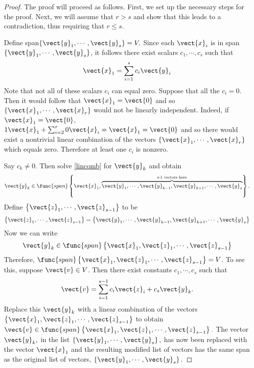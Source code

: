 \begin{proof} The proof will proceed as follows. First, we set up the necessary steps for the proof. Next, we will assume that $r > s$ and show that this leads to a contradiction, thus requiring that $r \leq s$. 

Define span$\left\{ \vect{y}_{1},\cdots ,\vect{y}_{s}\right\} = V.$ Since each $\vect{x}_i$ is in  span$\left\{ \vect{y}_{1},\cdots ,\vect{y}_{s}\right\}$, it follows there exist scalars $c_{1},\cdots ,c_{s}$
such that 
\begin{equation}
\vect{x}_{1}=\sum_{i=1}^{s}c_{i}\vect{y}_{i}  \label{lincomb}
\end{equation}
Note that not all of these scalars $c_i$ can equal zero. Suppose that all the $c_i=0$. Then it
would follow that $\vect{x}_{1}=\vect{0}$ and so $\left\{ \vect{x}
_{1},\cdots ,\vect{x}_{r}\right\} $ would not be linearly independent.
Indeed, if $\vect{x}_{1}=\vect{0}$, $1\vect{x}_{1}+\sum_{i=2}^{r}0
\vect{x}_{i}=\vect{x}_{1}=\vect{0}$ and so there would exist a
nontrivial linear combination of the vectors $\left\{ \vect{x}_{1},\cdots ,
\vect{x}_{r}\right\} $ which equals zero. Therefore at least one $c_i$ is nonzero. 

Say $c_{k}\neq 0.$ Then solve \ref{lincomb} for $\vect{y}_{k}$ and obtain 
\begin{equation*}
\vect{y}_{k}\in \func{span}\left\{ \vect{x}_{1},\overset{\text{s-1
vectors here}}{\overbrace{\vect{y}_{1},\cdots ,\vect{y}_{k-1},\vect{y}
_{k+1},\cdots ,\vect{y}_{s}}}\right\} .
\end{equation*}
Define $\left\{ \vect{z}_{1},\cdots ,\vect{z}_{s-1}\right\} $ to be
\begin{equation*}
\left\{ \vect{z}_{1},\cdots ,\vect{z}_{s-1}\right\} = \left\{ 
\vect{y}_{1},\cdots ,\vect{y}_{k-1},\vect{y}_{k+1},\cdots ,\vect{y}
_{s}\right\}
\end{equation*}
Now we can write 
\begin{equation*}
\vect{y}_{k}\in \func{span}\left\{ \vect{x}_{1}, \vect{z}_{1},\cdots, \vect{z}_{s-1}\right\} 
\end{equation*}
Therefore, $\func{span}\left\{ \vect{x}_{1},\vect{z}_{1},\cdots ,\vect{z
}_{s-1}\right\}=V$. To see this, suppose $\vect{v}\in V$. Then there exist constants $
c_{1},\cdots ,c_{s}$ such that 
\begin{equation*}
\vect{v}=\sum_{i=1}^{s-1}c_{i}\vect{z}_{i}+c_{s}\vect{y}_{k}.
\end{equation*}
Replace this $\vect{y}_{k}$ with a linear combination of the
vectors $\left\{ \vect{x}_{1},\vect{z}_{1},\cdots ,\vect{z}_{s-1}\right\}$
to obtain $\vect{v}\in \func{span}\left\{ \vect{x}_{1},\vect{z}
_{1},\cdots ,\vect{z}_{s-1}\right\} .$ The vector $\vect{y}_{k},$ in the
list $\left\{ \vect{y}_{1},\cdots ,\vect{y}_{s}\right\} ,$ has now been
replaced with the vector $\vect{x}_{1}$ and the resulting modified list of
vectors has the same span as the original list of vectors, $\left\{ \vect{y
}_{1},\cdots ,\vect{y}_{s}\right\} .$


\end{proof}
